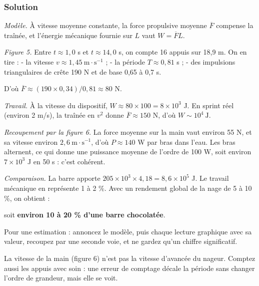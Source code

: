 \documentclass[11pt,a4paper]{article}
\newcommand{\equationajustee}[1]{%
  \sbox{\boiteequation}{$\displaystyle #1$}%
  \ifdim\wd\boiteequation>\linewidth
    \[\resizebox{\linewidth}{!}{\usebox{\boiteequation}}\]%
  \else
    \[#1\]%
  \fi}
\begin{document}
\hypertarget{solution-4}{%
\subsubsection{Solution}\label{solution-4}}

\emph{Modèle.} À vitesse moyenne constante, la force propulsive moyenne \(\overline F\) compense la traînée, et l'énergie mécanique fournie sur \(L\) vaut \(W = \overline F L\).

\emph{Figure 5.} Entre \(t \approx 1{,}0\) s et \(t \approx 14{,}0\) s, on compte 16 appuis sur 18,9 m. On en tire :
- la vitesse \(v \approx 1{,}45\ \mathrm{m\cdot s^{-1}}\) ;
- la période \(T \approx 0{,}81\) s ;
- des impulsions triangulaires de crête 190 N et de base 0,65 à 0,7 s.

D'où \(\overline F \approx (190\times 0{,}34)/0{,}81 \approx 80\) N.

\emph{Travail.} À la vitesse du dispositif, \(W \approx 80\times 100 = 8\times 10^3\) J. En sprint réel (environ 2 m/s), la traînée en \(v^2\) donne \(\overline F \approx 150\) N, d'où \(\boxed{W \sim 10^4\ \mathrm J}\).

\emph{Recoupement par la figure 6.} La force moyenne sur la main vaut environ 55 N, et sa vitesse environ \(2{,}6\ \mathrm{m\cdot s^{-1}}\), d'où \(P \approx 140\) W par bras dans l'eau. Les bras alternent, ce qui donne une puissance moyenne de l'ordre de 100 W, soit environ \(7\times 10^3\) J en 50 s : c'est cohérent.

\emph{Comparaison.} La barre apporte \(205\times 10^3\times 4{,}18 = 8{,}6\times 10^5\) J. Le travail mécanique en représente 1 à 2 \%. Avec un rendement global de la nage de 5 à 10 \%, on obtient :

\equationajustee{\boxed{E_{\text{\text{dépensée}}} \sim 10^5\ \mathrm J\ (25\ \text{\text{à}}\ 50\ \mathrm{kcal})}}

soit \textbf{environ 10 à 20 \% d'une barre chocolatée}.

\begin{methode}

Pour une estimation : annoncez le modèle, puis chaque lecture graphique avec sa valeur, recoupez par une seconde voie, et ne gardez qu'un chiffre significatif.

\end{methode}

\begin{piege}

La vitesse de la main (figure 6) n'est pas la vitesse d'avancée du nageur. Comptez aussi les appuis avec soin : une erreur de comptage décale la période sans changer l'ordre de grandeur, mais elle se voit.

\end{piege}
\end{document}
